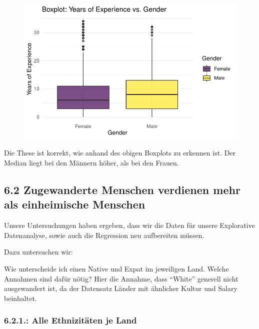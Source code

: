 \documentclass[
  letterpaper,
  DIV=11,
  numbers=noendperiod]{scrartcl}
\begin{document}
\begin{figure}[H]

{\centering \includegraphics{main_doc_files/figure-pdf/unnamed-chunk-72-1.pdf}

}

\end{figure}

Die These ist korrekt, wie anhand des obigen Boxplots zu erkennen ist.
Der Median liegt bei den Männern höher, als bei den Frauen.

\hypertarget{zugewanderte-menschen-verdienen-mehr-als-einheimische-menschen}{%
\subsection{6.2 Zugewanderte Menschen verdienen mehr als einheimische
Menschen}\label{zugewanderte-menschen-verdienen-mehr-als-einheimische-menschen}}

Unsere Untersuchungen haben ergeben, dass wir die Daten für unsere
Explorative Datenanalyse, sowie auch die Regression neu aufbereiten
müssen.

Dazu untersuchen wir:

Wie unterscheide ich einen Native und Expat im jeweiligen Land. Welche
Annahmen sind dafür nötig? Hier die Annahme, dass ``White'' generell
nicht ausgewandert ist, da der Datensatz Länder mit ähnlicher Kultur und
Salary beinhaltet.

\hypertarget{alle-ethnizituxe4ten-je-land}{%
\subsubsection{6.2.1.: Alle Ethnizitäten je
Land}\label{alle-ethnizituxe4ten-je-land}}
\end{document}
